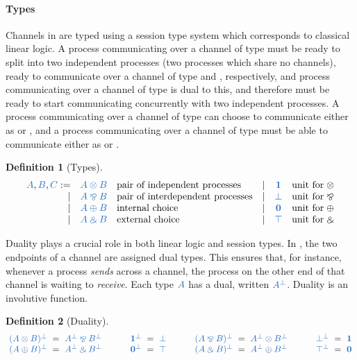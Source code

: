 \documentclass[draft,submission,copyright,creativecommons]{eptcs}
\newtheorem{definition}{Definition}
\begin{document}
\paragraph{Types}
Channels in \cp are typed using a session type system which corresponds to
classical linear logic.
A process communicating over a channel of type  must be ready to
split into two independent processes (two processes which share no
channels), ready to communicate over a channel of type  and ,
respectively, and process communicating over a channel of type  is
dual to this, and therefore must be ready to start communicating concurrently
with two independent processes.
A process communicating over a channel of type  can choose to
communicate either as  or , and a process communicating over a
channel of type  must be able to communicate either as  or
.
\begin{definition}[Types]\label{def:cp-types}
  \[
    \begin{array}{rclrcl}
      \ty{A}, \ty{B}, \ty{C}
           :=& \ty{A \tens B} &\text{pair of independent processes}
      &  \mid& \ty{\one}      &\text{unit for} \; {\tens}
      \\ \mid& \ty{A \parr B} &\text{pair of interdependent processes}
      &  \mid& \ty{\bot}      &\text{unit for} \; {\parr}
      \\ \mid& \ty{A \plus B} &\text{internal choice}
      &  \mid& \ty{\nil}      &\text{unit for} \; {\plus}
      \\ \mid& \ty{A \with B} &\text{external choice}
      &  \mid& \ty{\top}      &\text{unit for} \; {\with}
    \end{array}
  \]
\end{definition}\noindent
Duality plays a crucial role in both linear logic and session types.
In \cp, the two endpoints of a channel are assigned dual types.
This ensures that, for instance, whenever a process \emph{sends} across a
channel, the process on the other end of that channel is waiting to
\emph{receive}.
Each type $\ty{A}$ has a dual, written $\ty{A^\bot}$.
Duality is an involutive function.
\begin{definition}[Duality]\label{def:cp-negation}
  \[
    \setlength{\arraycolsep}{3pt}
    \begin{array}{lclclclclclclcl}
               \ty{(A \tens B)^\bot} & = & \ty{A^\bot \parr B^\bot}
      &\qquad& \ty{\one^\bot}        & = & \ty{\bot}
      &\qquad& \ty{(A \parr B)^\bot} & = & \ty{A^\bot \tens B^\bot}
      &\qquad& \ty{\bot^\bot}        & = & \ty{\one}
      \\       \ty{(A \plus B)^\bot} & = & \ty{A^\bot \with B^\bot}
      &\qquad& \ty{\nil^\bot}        & = & \ty{\top}
      &\qquad& \ty{(A \with B)^\bot} & = & \ty{A^\bot \plus B^\bot}
      &\qquad& \ty{\top^\bot}        & = & \ty{\nil}
    \end{array}
  \]
\end{definition}\noindent
\end{document}
